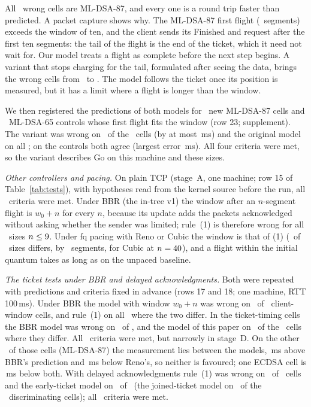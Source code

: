 \documentclass[sigconf,9pt,nonacm]{acmart}
\newcommand{\ms}{\,ms\xspace}
\begin{document}
All \GoWrongSuiteN\ wrong cells are ML-DSA-87, and every one is a round trip faster than predicted. A packet capture shows why. The ML-DSA-87 first flight (\GoChMlEightSeven\ segments) exceeds the window of ten, and the client sends its Finished and request after the first ten segments: the tail of the flight is the end of the ticket, which it need not wait for. Our model treats a flight as complete before the next step begins. A variant that stops charging for the tail, formulated after seeing the data, brings the wrong cells from \GoPostBefore\ to \GoPostAfter. The model follows the ticket once its position is measured, but it has a limit where a flight is longer than the window.

We then registered the predictions of both models for \GeighteenN\ new ML-DSA-87 cells and \GeighteenCtlN\ ML-DSA-65 controls whose first flight fits the window (row 23; supplement). The variant was wrong on \GeighteenWrongPip\ of the \GeighteenN\ cells (by at most \GeighteenMaxErr\ms) and the original model on all \GeighteenWrongGo; on the controls both agree (largest error \GeighteenCtlErr\ms). All four criteria were met, so the variant describes Go on this machine and these sizes.

\emph{Other controllers and pacing.} On plain TCP (stage~A, one machine; row 15 of Table~\ref{tab:tests}), with hypotheses read from the kernel source before the run, all \GelevenN\ criteria were met. Under BBR (the in-tree v1) the window after an $n$-segment flight is $w_0+n$ for every $n$, because its update adds the packets acknowledged without asking whether the sender was limited; rule~(1) is therefore wrong for all \GelBbrWrongW\ sizes $n\le9$. Under fq pacing with Reno or Cubic the window is that of (1) (\GelCubDiffW\ of \GelCubSizes\ sizes differs, by \GelCubDeltaW\ segments, for Cubic at $n=40$), and a flight within the initial quantum takes as long as on the unpaced baseline.

\emph{The ticket tests under BBR and delayed acknowledgments.} Both were repeated with predictions and criteria fixed in advance (rows 17 and 18; one machine, RTT 100\ms). Under BBR the model with window $w_0+n$ was wrong on \GfBbrCWrong\ of \GfBbrCN\ client-window cells, and rule~(1) on all \GfBbrRuleWrong\ where the two differ. In the ticket-timing cells the BBR model was wrong on \GfBbrDWrong\ of \GfBbrDN, and the model of this paper on \GfBbrRenoWrong\ of the \GfBbrDDiff\ cells where they differ. All \GfBbrK\ criteria were met, but narrowly in stage~D. On the other \GfMidNW\ of those cells (ML-DSA-87) the measurement lies between the models, \GfMidAbove\ms above BBR's prediction and \GfMidBelow\ms below Reno's, so neither is favoured; one ECDSA cell is \GfLow\ms below both. With delayed acknowledgments rule~(1) was wrong on \GfDelCWrong\ of \GfDelCN\ cells and the early-ticket model on \GfDelEarlyAll\ of \GfDelDN\ (the joined-ticket model on \GfDelJoinedDiff\ of the \GfDelDDiff\ discriminating cells); all \GfDelK\ criteria were met.
\end{document}
